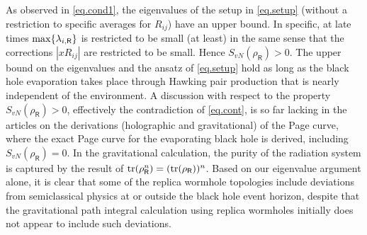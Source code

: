 \documentclass[11pt]{article}
\numberwithin{equation}{section}
\begin{document}
As observed in \eqref{eq.cond1}, the eigenvalues of the setup in \eqref{eq.setup} (without a restriction to specific averages for $R_{ij}$) have an upper bound. In specific, at late times ${\rm max}\{\lambda_{i,\textsf{R}}\}$ is restricted to be small (at least) in the same sense that the corrections $|x R_{ij}|$ are restricted to be small. Hence $S_{vN}(\rho_\textsf{R})>0$. The upper bound on the eigenvalues and the ansatz of \eqref{eq.setup} hold as long as the black hole evaporation takes place through Hawking pair production that is nearly independent of the environment. A discussion with respect to the property $S_{vN}(\rho_\textsf{R})>0$, effectively the contradiction of \eqref{eq.cont}, is so far lacking in the articles on the derivations (holographic and gravitational) of the Page curve, where the exact Page curve for the evaporating black hole is derived, including $S_{vN}(\rho_\textsf{R})=0$. In the gravitational calculation, the purity of the radiation system is captured by the result of ${\rm tr}(\rho_\textsf{R}^n)=({\rm tr}(\rho_\textsf{R}))^n$. Based on our eigenvalue argument alone, it is clear that some of the replica wormhole topologies include deviations from semiclassical physics at or outside the black hole event horizon, despite that the gravitational path integral calculation using replica wormholes initially does not appear to include such deviations.
\end{document}
